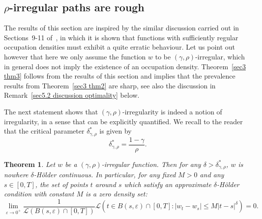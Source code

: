 \documentclass[10pt]{article}
\newtheorem{theorem}{Theorem}
\begin{document}
\subsection{$\rho$\mbox{-}irregular paths are rough}\label{sec5.2}

The results of this section are inspired by the similar discussion carried out
in Sections~9\mbox{-}11 of~{\cite{geman}}, in which it is shown that functions
with sufficiently regular occupation densities must exhibit a quite erratic
behaviour. Let us point out however that here we only assume the function $w$
to be $(\gamma, \rho)$\mbox{-}irregular, which in general does not imply the
existence of an occupation density. Theorem~\ref{sec3 thm3} follows from the
results of this section and implies that the prevalence results from
Theorem~\ref{sec3 thm2} are sharp, see also the discussion in
Remark~\ref{sec5.2 discussion optimality} below.

The next statement shows that $(\gamma, \rho)$\mbox{-}irregularity is indeed a
notion of irregularity, in a sense that can be explicitly quantified. We
recall to the reader that the critical parameter $\delta^{\ast}_{\gamma,
\rho}$ is given by
\[ \delta^{\ast}_{\gamma, \rho} = \frac{1 - \gamma}{\rho} . \]


\begin{theorem}
  \label{sec5.2 proposition irregularity}Let $w$ be a $(\gamma,
  \rho)$-irregular function. Then for any $\delta > \delta^{\ast}_{\gamma,
  \rho}$, $w$ is nowhere $\delta$\mbox{-}H\"{o}lder continuous. In particular,
  for any fixed $M > 0$ and any $s \in [0, T]$, the set of points $t$ around
  $s$ which satisfy an approximate $\delta$\mbox{-}H\"{o}lder condition with
  constant $M$ is a zero density set:
  \[ \lim_{\varepsilon \rightarrow 0^+} \frac{1}{\mathcal{L} (B (s,
     \varepsilon) \cap [0, T])} \mathcal{L} (t \in B (s, \varepsilon) \cap [0,
     T] : | w_t - w_s | \leqslant M | t - s |^{\delta}) = 0. \]
\end{theorem}
\end{document}
